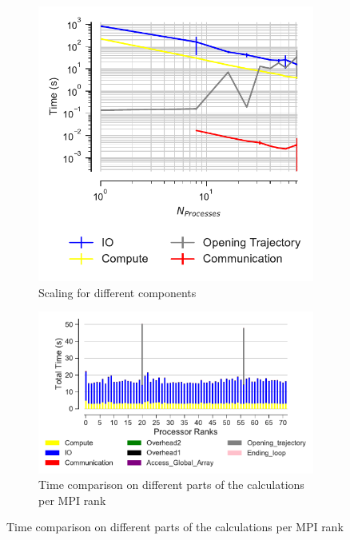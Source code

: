 \begin{figure}[ht!]
\begin{subfigure}{.4\textwidth}
  \includegraphics[width=\linewidth]{figures/RMSD-ga4py-time_IO_comparison.pdf}
  \captionsetup{format=hang}
\caption{Scaling for different components}
\label{fig:ScalingComputeIO-ga4py}
\end{subfigure}
\hfill
\begin{subfigure} {.5\textwidth}
  \includegraphics[width=\linewidth]{figures/RMSD-ga4py-BarPlot-rank-comparison_72_1.pdf}
  \captionsetup{format=hang}
  \caption{Time comparison on different parts of the calculations per MPI rank}
  \label{fig:MPIranks-ga4py}
\end{subfigure}


\end{figure}

